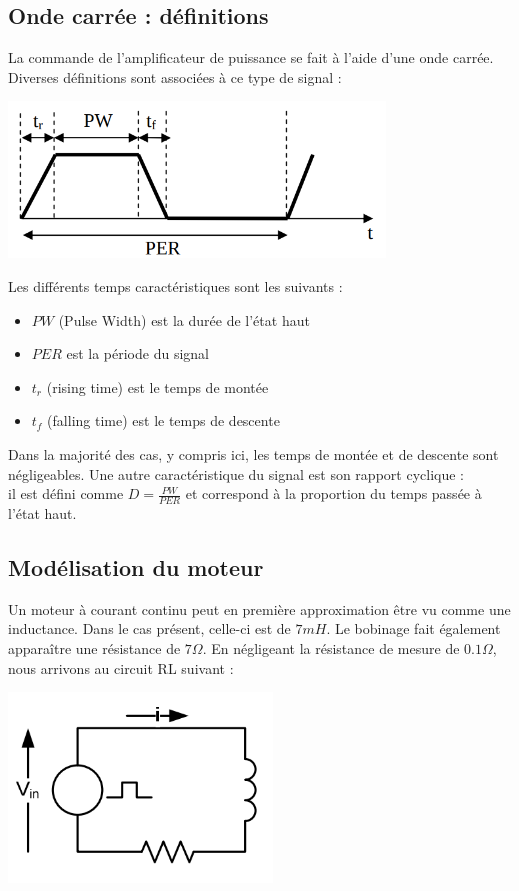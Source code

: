 \documentclass{../template/labo}
\begin{document}
\subsection{Onde carrée : définitions}
La commande de l'amplificateur de puissance se fait à l'aide d'une onde carrée. Diverses
définitions sont associées à ce type de signal :

\begin{center}
\includegraphics[width=10cm]{sch2}
\end{center}

Les différents temps caractéristiques sont les suivants :

\begin{itemize}
\item $PW$ (Pulse Width) est la durée de l'état haut
\item $PER$ est la période du signal
\item $t_r$ (rising time) est le temps de montée
\item $t_f$ (falling time) est le temps de descente
\end{itemize}

Dans la majorité des cas, y compris ici, les temps de montée et de descente sont négligeables.
Une autre caractéristique du signal est son rapport cyclique :\\

il est défini comme $D = \frac{PW}{PER}$ et correspond à la proportion du temps passée à l'état haut.

\subsection{Modélisation du moteur}

Un moteur à courant continu peut en première approximation être vu comme une inductance. Dans
le cas présent, celle-ci est de $7mH$. Le bobinage fait également apparaître une résistance de
$7\Omega$.
En négligeant la résistance de mesure de $0.1\Omega$, nous arrivons au circuit RL suivant :

\begin{center}
\includegraphics[width=7cm]{sch3}
\end{center}
\vspace*{2cm}
\end{document}
